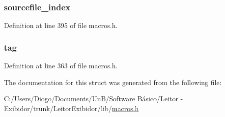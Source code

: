 \subsubsection[{sourcefile\+\_\+index}]{ sourcefile\+\_\+index}\label{structattribute__info_a84ee4fb337ef79f587712533075a6bbc}


Definition at line 395 of file macros.\+h.

\hypertarget{structattribute__info_a17726ed17c64ec8550633ebf17fd1a98}{}
\subsubsection[{tag}]{ tag}\label{structattribute__info_a17726ed17c64ec8550633ebf17fd1a98}


Definition at line 363 of file macros.\+h.



The documentation for this struct was generated from the following file\+:\begin{DoxyCompactItemize}
\item 
C\+:/\+Users/\+Diogo/\+Documents/\+Un\+B/\+Software Básico/\+Leitor -\/ Exibidor/trunk/\+Leitor\+Exibidor/lib/\hyperlink{macros_8h}{macros.\+h}\end{DoxyCompactItemize}
